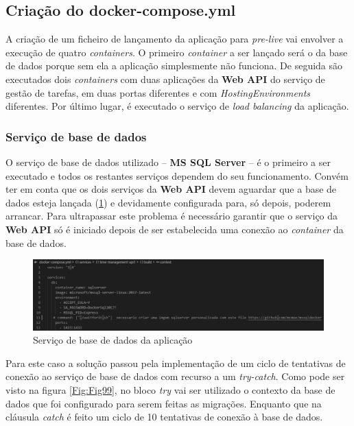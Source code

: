 \subsection{Criação do docker-compose.yml}

\hspace{1cm}A criação de um ficheiro de lançamento da aplicação para \textit{pre-live} vai envolver a execução de quatro \textit{containers}. O primeiro \textit{container} a ser lançado será o da base de dados porque sem ela a aplicação simplesmente não funciona. De seguida são executados dois \textit{containers} com duas aplicações da \textbf{Web API} do serviço de gestão de tarefas, em duas portas diferentes e com \textit{HostingEnvironments} diferentes. Por último lugar, é executado o serviço de \textit{load balancing} da aplicação.

\subsubsection{Serviço de base de dados}

\hspace{1cm}O serviço de base de dados utilizado -- \textbf{MS SQL Server} -- é o primeiro a ser executado e todos os restantes serviços dependem do seu funcionamento. Convém ter em conta que os dois serviços da \textbf{Web API} devem aguardar que a base de dados esteja lançada (\ref{Fig:Fig93}) e devidamente configurada para, só depois, poderem arrancar. Para ultrapassar este problema é necessário garantir que o serviço da \textbf{Web API} só é iniciado depois de ser estabelecida uma conexão ao \textit{container} da base de dados.

\begin{figure}[hbt!]
\centering
\includegraphics[width=0.9\linewidth]{Cap7/TimeManagementDCSQLServer.png}
\caption{Serviço de base de dados da aplicação}
\label{Fig:Fig93}
\end{figure}

Para este caso a solução passou pela implementação de um ciclo de tentativas de conexão ao serviço de base de dados com recurso a um \textit{try-catch}. Como pode ser visto na figura \ref{Fig:Fig99}, no bloco \textit{try} vai ser utilizado o contexto da base de dados que foi configurado para serem feitas as migrações. Enquanto que na cláusula \textit{catch} é feito um ciclo de 10 tentativas de conexão à base de dados.

